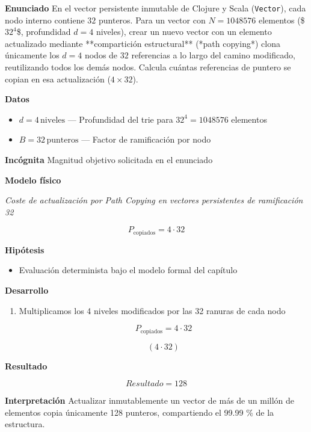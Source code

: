 \documentclass{book}
\begin{document}
\begin{tcolorbox}[title={Problema resuelto}, studiumworked, breakable]

\noindent\textbf{Enunciado}
En el vector persistente inmutable de Clojure y Scala (\texttt{Vector}), cada nodo interno contiene \(32\) punteros. Para un vector con \(N = 1048576\) elementos (\$\(32^4\)\$, profundidad \(d = 4\) niveles), crear un nuevo vector con un elemento actualizado mediante **compartición estructural** (*path copying*) clona únicamente los \(d = 4\) nodos de \(32\) referencias a lo largo del camino modificado, reutilizando todos los demás nodos. Calcula cuántas referencias de puntero se copian en esa actualización (\(4 \times 32\)).

\noindent\textbf{Datos}
\begin{itemize}
\item $d = 4\,\mathrm{niveles}$ — Profundidad del trie para \(32^4 = 1048576\) elementos
\item $B = 32\,\mathrm{punteros}$ — Factor de ramificación por nodo
\end{itemize}

\noindent\textbf{Incógnita}
Magnitud objetivo solicitada en el enunciado

\noindent\textbf{Modelo físico}

\noindent\textit{Coste de actualización por Path Copying en vectores persistentes de ramificación 32}

\[
P_{\text{copiados}} = 4 \cdot 32
\]

\noindent\textbf{Hipótesis}
\begin{itemize}
\item Evaluación determinista bajo el modelo formal del capítulo
\end{itemize}

\noindent\textbf{Desarrollo}
\begin{enumerate}
\item
Multiplicamos los 4 niveles modificados por las 32 ranuras de cada nodo

\[
P_{\text{copiados}} = 4 \cdot 32
\]

\[
\left(4\cdot 32\right)
\]
\end{enumerate}

\noindent\textbf{Resultado}

\[
Resultado = 128
\]

\noindent\textbf{Interpretación}
Actualizar inmutablemente un vector de más de un millón de elementos copia únicamente 128 punteros, compartiendo el 99.99 \% de la estructura.


\end{tcolorbox}
\end{document}
